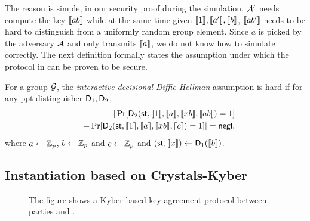The reason is simple, in our security proof during the simulation, $\mathcal{A}'$ needs compute the key $\llbracket ab \rrbracket$ while at the same time given $\llbracket 1\rrbracket,\llbracket a'\rrbracket,\llbracket b\rrbracket$, $\llbracket ab'\rrbracket$ needs to be hard to distinguish from a uniformly random group element. Since $a$ is picked by the adversary $\mathcal{A}$ and only transmits $\llbracket a \rrbracket$, we do not know how to simulate correctly. The next definition formally states the assumption under which the protocol in  can be proven to be secure. 

\begin{definition}\label{def:IDDH}
For a group $\mathcal{G}$, the \emph{interactive decisional Diffie-Hellman} assumption is hard if for any ppt distinguisher $\mathsf D_1,\mathsf D_2$,
\begin{eqnarray*}
&&|\Pr[ \mathsf D_2(\mathsf{st},\llbracket 1\rrbracket,\llbracket a\rrbracket,\llbracket xb\rrbracket,\llbracket ab\rrbracket)=1]\\
&&-\Pr[ \mathsf D_2(\mathsf{st},\llbracket 1\rrbracket,\llbracket a\rrbracket,\llbracket xb\rrbracket,\llbracket c\rrbracket)=1]|=\mathsf{negl},
\end{eqnarray*}
where $a\leftarrow\mathbb Z_p$, $b\leftarrow\mathbb Z_p$ and $c\leftarrow\mathbb Z_p$ and $(\mathsf{st},\llbracket x\rrbracket)\leftarrow\mathsf D_1(\llbracket b\rrbracket)$.
\end{definition}









\subsection{Instantiation based on Crystals-Kyber}
 

\begin{figure}[h!]
\centering
{}
\label{fig:Kyber}
\caption{The figure shows a Kyber based key agreement protocol between parties \A and \B.}
\end{figure}

